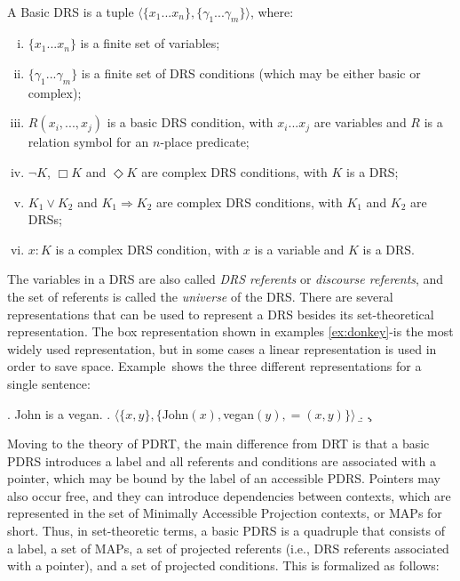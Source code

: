 \begin{definition} \label{def:bDRS}~\\
A Basic DRS is a tuple $\langle \{x_1 ... x_n\},\{\gamma_1 ... \gamma_m\} 
\rangle$, where:
 \begin{enumerate}[i.]
  \item $\{x_1 ... x_n\}$ is a finite set of variables;
  \item $\{\gamma_1 ... \gamma_m\}$ is a finite set of DRS conditions (which
    may be either basic or complex);
  \item\label{def:bDRS:Rel} $R(x_i, ..., x_j)$ is a basic DRS condition,
    with $x_i ... x_j$ are variables and $R$ is a relation symbol for an
    $n$-place predicate;
  \item $\neg K$, $\Box K$ and $\Diamond K$ are complex DRS conditions, with
    $K$ is a DRS;
  \item $K_1 \vee K_2$ and $K_1 \Rightarrow K_2$ are complex DRS conditions,
    with $K_1$ and $K_2$ are DRSs;
  \item \label{def:bDRS:Prop} $x:K$ is a complex DRS condition, with $x$ is
    a variable and $K$ is a DRS.
 \end{enumerate} 
\end{definition}

\noindent The variables in a DRS are also called \textit{DRS referents} or
\textit{discourse referents}, and the set of referents is called the
\textit{universe} of the DRS.  There are several representations that can be
used to represent a DRS besides its set-theoretical representation. The box
representation shown in examples \ref{ex:donkey}-\Last is the most widely
used representation, but in some cases a linear representation is used in
order to save space. Example~\Next shows the three different
representations for a single sentence:

\ex. John is a vegan.
\a. $\langle \{x, y\},\{$John$(x),$vegan$(y), =(x,y)\}\rangle$
\b. 
\c. 

Moving to the theory of PDRT, the main difference from DRT is that a basic
PDRS introduces a label and all referents and conditions are associated with
a pointer, which may be bound by the label of an accessible PDRS. Pointers
may also occur free, and they can introduce dependencies between contexts,
which are represented in the set of Minimally Accessible Projection
contexts, or MAPs for short. Thus, in set-theoretic terms, a basic PDRS is
a quadruple that consists of a label, a set of MAPs, a set of projected
referents (i.e., DRS referents associated with a pointer), and a set of
projected conditions. This is formalized as follows:


